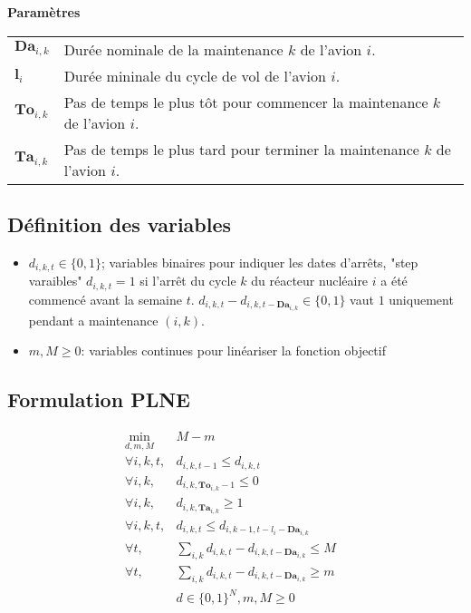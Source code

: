 \documentclass[a4paper,11pt]{article}
\begin{document}
    \vskip 0.3cm

    \textbf{Paramètres}


    \begin{tabular}{ll}
        $\mathbf{Da}_{i,k}$ & Durée nominale de la maintenance $k$ de l'avion $i$.\\
        $\mathbf{l}_{i}$ & Durée mininale du cycle de vol de l'avion $i$.\\
        $\mathbf{{To}}_{i,k}$ & Pas de temps le plus tôt pour commencer la maintenance $k$ de l'avion $i$.\\
        $\mathbf{{Ta}}_{i,k}$ & Pas de temps le plus tard pour terminer la maintenance $k$ de l'avion $i$.\\
    \end{tabular}


    \subsection{Définition des variables}

    \begin{itemize}
     \item $d_{i,k,t}\in \{0,1\}$; variables binaires pour indiquer les dates d'arrêts, "step varaibles" 
    $d_{i,k,t}=1$ si l'arrêt du cycle $k$ du réacteur nucléaire $i$ a été commencé avant la semaine $t$.
    $d_{i,k,t}-d_{i,k,t- {\mathbf{Da}_{i,k}}} \in \{0,1\}$ vaut $1$ uniquement pendant a maintenance $(i,k)$.


     \item $m,M\geqslant 0$: variables continues pour linéariser la fonction objectif
    \end{itemize}


    \subsection{Formulation PLNE}


    \begin{eqnarray}
    \displaystyle \min_{d,m,M} & M-m
     & \\
    \forall i , k, t, & d_{i,k,t-1}\leqslant d_{i,k,t} & \label{PANprecedence}\\
    \forall i , k, & d_{i,k,\mathbf{To}_{i,k}-1}\leqslant 0 & \label{PANtw0} \\
    \forall i , k, & d_{i,k,\mathbf{Ta}_{i,k}}\geqslant 1 & \label{PANtw1}\\
    \forall i , k, t, & d_{i,k,t}\leqslant d_{i,k-1,t-l_i-\mathbf{Da}_{i,k}} & \label{PANprecedence2}\\
    \forall t, & \displaystyle \sum_{i,k} d_{i,k,t}-d_{i,k,t- {\mathbf{Da}_{i,k}}} \leqslant M & \label{maxMaint}\\
    \forall t, & \displaystyle \sum_{i,k} d_{i,k,t}-d_{i,k,t- {\mathbf{Da}_{i,k}}} \geqslant m & \label{minMaint}\\
    & d \in \{0,1\}^N, m,M \geqslant 0
    \end{eqnarray}
\end{document}
